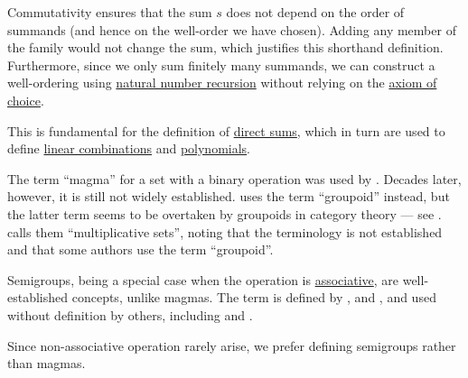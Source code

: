 \begin{remark}
\begin{thmenum}
\begin{thmenum}
      Commutativity ensures that the sum \( s \) does not depend on the order of summands (and hence on the well-order we have chosen). Adding any member of the family would not change the sum, which justifies this shorthand definition. Furthermore, since we only sum finitely many summands, we can construct a well-ordering using \hyperref[rem:natural_number_recursion]{natural number recursion} without relying on the \hyperref[def:zfc/choice]{axiom of choice}.

      This is fundamental for the definition of \hyperref[def:semimodule_direct_sum]{direct sums}, which in turn are used to define \hyperref[rem:linear_combinations]{linear combinations} and \hyperref[def:polynomial_algebra]{polynomials}.
    \end{thmenum}
  \end{thmenum}
\end{remark}

\begin{remark}\label{rem:magma_terminology}
  The term \enquote{magma} for a set with a binary operation was used by . Decades later, however, it is still not widely established.  uses the term \enquote{groupoid} instead, but the latter term seems to be overtaken by groupoids in category theory --- see .  calls them \enquote{multiplicative sets}, noting that the terminology is not established and that some authors use the term \enquote{groupoid}.

  Semigroups, being a special case when the operation is \hyperref[def:binary_operation/associative]{associative}, are well-established concepts, unlike magmas. The term is defined by ,  and , and used without definition by others, including  and .

  Since non-associative operation rarely arise, we prefer defining semigroups rather than magmas.
\end{remark}

